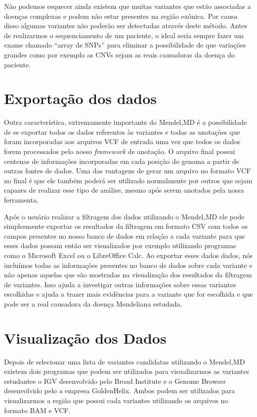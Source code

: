 Não podemos esquecer ainda existem que muitas variantes que estão associadas a doenças complexas e podem não estar presentes na região exônica. Por causa disso algumas variantes não poderão ser detectadas através deste método. Antes de realizarmos o sequenciamento de um paciente, o ideal seria sempre fazer um exame chamado ``array de SNPs'' para eliminar a possibilidade de que variações grandes como por exemplo as CNVs sejam as reais causadoras da doença do paciente.

\section{Exportação dos dados}

Outra característica, extremamente importante do Mendel,MD é a possibilidade de se exportar todos os dados referentes às variantes e todas as anotações que foram incorporadas aos arquivos VCF de entrada uma vez que todos os dados forem processados pelo nosso \textit{framework} de anotação. O arquivo final possui centenas de informações incorporadas em cada posição do genoma a partir de outras fontes de dados. Uma das vantagens de gerar um arquivo no formato VCF no final é que ele também poderá ser utilizado normalmente por outros que sejam capazes de realizar esse tipo de análise, mesmo após serem anotados pela nossa ferramenta.

Após o usuário realizar a filtragem dos dados utilizando o Mendel,MD ele pode simplesmente exportar os resultados da filtragem em formato CSV com todos os campos presentes no nosso banco de dados em relação a cada variante para que esses dados possam então ser visualizados por exemplo utilizando programas como o Microsoft Excel ou o LibreOffice Calc. Ao exportar esses dados dados, nós incluímos todas as informações presentes no banco de dados sobre cada variante e não apenas aquelas que são mostradas na visualização dos resultados da filtragem de variantes. Isso ajuda a investigar outras informações sobre essas variantes escolhidas e ajuda a trazer mais evidências para a variante que for escolhida e que pode ser a real causadora da doença Mendeliana estudada.

\section{Visualização dos Dados}

Depois de selecionar uma lista de variantes candidatas utilizando o Mendel,MD existem dois programas que podem ser utilizados para visualizarmos as variantes estudantes o IGV desenvolvido pelo Broad Institute e o Genome Browser desenvolvido pelo a empresa GoldenHelix. Ambos podem ser utilizados para visualizarmos a região que possui cada variantes utilizando os arquivos no formato BAM e VCF.

